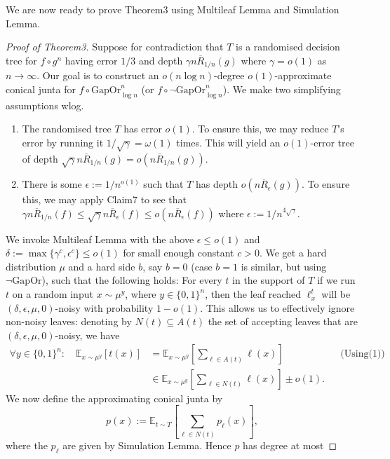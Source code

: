 We are now ready to prove Theorem3 using Multileaf Lemma and Simulation Lemma.
\begin{proof}[Proof of Theorem3]
Suppose for contradiction that $T$ is a randomised decision tree for $f\circ g^n$ having error $1/3$ and depth $\gamma n\overline R_{1/n}(g)$ where $\gamma=o(1)$ as $n\to\infty$. Our goal is to construct an $o(n\log n)$-degree $o(1)$-approximate conical junta for $f\circ\mathrm{GapOr}_{\log n}^n$ (or $f\circ\neg\mathrm{GapOr}_{\log n}^n$).
We make two simplifying assumptions wlog.
\begin{enumerate}
\item The randomised tree $T$ has error $o(1)$. To ensure this, we may reduce $T$'s error by running it $1/\sqrt\gamma=\omega(1)$ times. This will yield an $o(1)$-error tree of depth $\sqrt\gamma n\overline R_{1/n}(g)=o(n\overline R_{1/n}(g))$.
\item There is some $\epsilon:=1/n^{o(1)}$ such that $T$ has depth $o(n\overline R_\epsilon(g))$. To ensure this, we may apply Claim7 to see that $\gamma n\overline R_{1/n}(f)\le\sqrt\gamma n\overline R_\epsilon(f)\le o(n\overline R_\epsilon(f))$ where $\epsilon:=1/n^{4\sqrt\gamma}$.
\end{enumerate}
We invoke Multileaf Lemma with the above $\epsilon\le o(1)$ and $\delta:=\max\{\gamma^c,\epsilon^c\}\le o(1)$ for small enough constant $c>0$. We get a hard distribution $\mu$ and a hard side $b$, say $b=0$ (case $b=1$ is similar, but using $\neg\mathrm{GapOr}$), such that the following holds: For every $t$ in the support of $T$ if we run $t$ on a random input $x\sim\mu^y$, where $y\in\{0,1\}^n$, then the leaf reached $\ell_x^t$ will be $(\delta,\epsilon,\mu,0)$-noisy with probability $1-o(1)$. This allows us to effectively ignore non-noisy leaves: denoting by $N(t)\subseteq A(t)$ the set of accepting leaves that are $(\delta,\epsilon,\mu,0)$-noisy, we have
\begin{equation}\tag{2}
\begin{aligned}
\forall y\in\{0,1\}^n:\quad\mathbb E_{x\sim\mu^y}[t(x)]
&=\mathbb E_{x\sim\mu^y}\left[\sum_{\ell\in A(t)}\ell(x)\right]&&\text{(Using(1))}\\
&\in\mathbb E_{x\sim\mu^y}\left[\sum_{\ell\in N(t)}\ell(x)\right]\pm o(1).
\end{aligned}
\end{equation}
We now define the approximating conical junta by
\[p(x):=\mathbb E_{t\sim T}\left[\sum_{\ell\in N(t)}p_\ell(x)\right],\]
where the $p_\ell$ are given by Simulation Lemma. Hence $p$ has degree at most

\end{proof}
